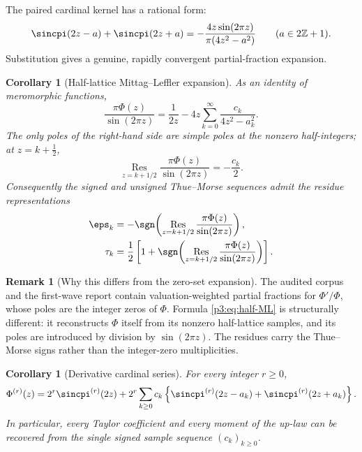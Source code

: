 \documentclass[11pt,oneside]{article}
\newtheorem{corollary}[theorem]{Corollary}
\theoremstyle{definition}
\newtheorem{remark}[theorem]{Remark}
\begin{document}
The paired cardinal kernel has a rational form:
\begin{equation}
 \sincpi(2z-a)+\sincpi(2z+a)
 =-\frac{4z\sin(2\pi z)}{\pi(4z^2-a^2)}
 \qquad(a\in2\mathbb Z+1).                                \label{p3:eq:paired-cardinal}
\end{equation}
Substitution gives a genuine, rapidly convergent partial-fraction expansion.

\begin{corollary}[Half-lattice Mittag--Leffler expansion]
\label{p3:cor:half-ML}
As an identity of meromorphic functions,
\begin{equation}
\boxed{
 \frac{\pi\Phi(z)}{\sin(2\pi z)}
 =\frac1{2z}
  -4z\sum_{k=0}^{\infty}
   \frac{c_k}{4z^2-a_k^2}.}                                \label{p3:eq:half-ML}
\end{equation}
The only poles of the right-hand side are simple poles at the nonzero half-integers; at
\(z=k+\tfrac12\),
\begin{equation}
 \operatorname*{Res}_{z=k+1/2}
 \frac{\pi\Phi(z)}{\sin(2\pi z)}=-\frac{c_k}{2}.           \label{p3:eq:half-residue}
\end{equation}
Consequently the signed and unsigned Thue--Morse sequences admit the residue
representations
\begin{align}
 \eps_k
 &=-\sgn\!\left(
 \operatorname*{Res}_{z=k+1/2}
 \frac{\pi\Phi(z)}{\sin(2\pi z)}\right),                 \label{p3:eq:tm-residue-sign}\\
 \tau_k
 &=\frac12\left[1+
 \sgn\!\left(
 \operatorname*{Res}_{z=k+1/2}
 \frac{\pi\Phi(z)}{\sin(2\pi z)}\right)\right].         \label{p3:eq:tm-residue-bit}
\end{align}
\end{corollary}

\begin{remark}[Why this differs from the zero-set expansion]
The audited corpus and the first-wave report contain valuation-weighted partial fractions
for \(\Phi'/\Phi\), whose poles are the integer zeros of \(\Phi\).  Formula
\eqref{p3:eq:half-ML} is structurally different: it reconstructs \(\Phi\) itself from its
nonzero half-lattice samples, and its poles are introduced by division by
\(\sin(2\pi z)\).  The residues carry the Thue--Morse signs rather than the
integer-zero multiplicities.
\end{remark}

\begin{corollary}[Derivative cardinal series]
\label{p3:cor:derivative-cardinal}
For every integer \(r\ge0\),
\begin{equation}
 \Phi^{(r)}(z)
 =2^r\sincpi^{(r)}(2z)
 +2^r\sum_{k\ge0}c_k
 \left\{\sincpi^{(r)}(2z-a_k)+\sincpi^{(r)}(2z+a_k)\right\}.
                                                               \label{p3:eq:derivative-cardinal}
\end{equation}
In particular, every Taylor coefficient and every moment of the up-law can be recovered
from the single signed sample sequence \((c_k)_{k\ge0}\).
\end{corollary}
\end{document}
